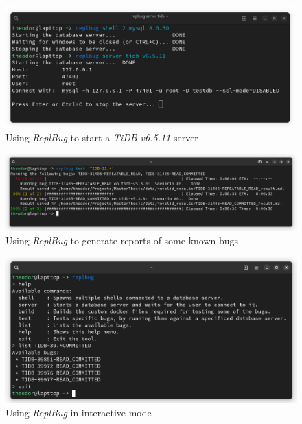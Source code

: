 \begin{figure}
    \centering
    \includegraphics[width=\linewidth]{assets/replbug_server.png}
    \caption{Using \textit{ReplBug} to start a \textit{TiDB v6.5.11} server}
    \label{fig:repl_server}
\end{figure}

\begin{figure}
    \centering
    \includegraphics[width=\linewidth]{assets/replbug_test.png}
    \caption{Using \textit{ReplBug} to generate reports of some known bugs}
    \label{fig:repl_test}
\end{figure}


\begin{figure}
    \centering
    \includegraphics[width=\linewidth]{assets/replbug_interactive.png}
    \caption{Using \textit{ReplBug} in interactive mode}
    \label{fig:repl_interactive}
\end{figure}




